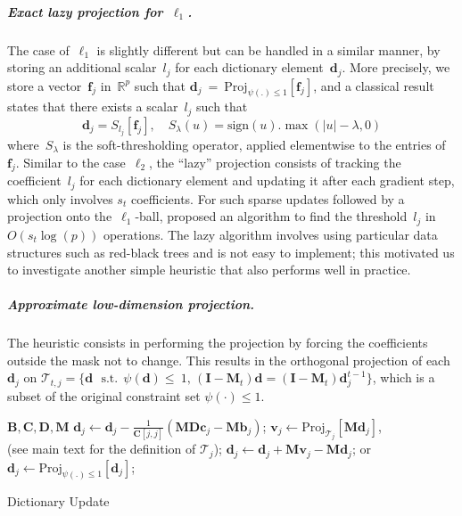 \documentclass{article}
\def\Real{{\mathbb{R}}}
\def\f{{\mathbf f}}
\def\c{{\mathbf c}}
\def\v{{\mathbf v}}
\def\I{{\mathbf I}}
\def\B{{\mathbf B}}
\def\b{{\mathbf b}}
\def\C{{\mathbf C}}
\def\D{{\mathbf D}}
\def\d{{\mathbf d}}
\def\b{{\mathbf b}}
\def\Real{{\mathbb R}}
\def\M{{\mathbf M}}
\begin{document}
\subparagraph{Exact lazy projection for~$\ell_1$.}
The case of~$\ell_1$ is slightly different but can be handled in a similar
manner, by storing an additional scalar~$l_j$ for each dictionary element~$\d_j$.
More precisely, we store a vector~$\f_j$ in~$\Real^p$ such that $\d_j~=~\text{Proj}_{\psi(.) \leq 1}[ \f_j]$,
and a classical result~\citep[see][]{duchi_efficient_2008} states that there
exists a scalar~$l_j$ such that
\begin{equation}
   \d_j = S_{l_j}[\f_j], \quad S_\lambda(u) = \text{sign}(u).
\max(|u|-\lambda,0)
\label{eq:softthreshold}
\end{equation}
where~$S_\lambda$ is the soft-thresholding operator, applied elementwise to the entries of~$\f_j$.
Similar to the case~$\ell_2$, the ``lazy'' projection consists of tracking the
coefficient~$l_j$ for each dictionary element and updating it after each
gradient step, which only involves $s_t$ coefficients.
For such sparse updates followed by a projection onto the~$\ell_1$-ball,
\citet{duchi_efficient_2008} proposed an algorithm to find the
threshold~$l_j$ in $O(s_t \log(p))$ operations.
The lazy algorithm involves using particular data structures such as red-black trees
and is not easy to implement; this motivated us to investigate another
simple heuristic that also performs well in practice.





\subparagraph{Approximate low-dimension projection.}
The heuristic consists in performing the projection by forcing the coefficients outside the mask not to change. This results in the orthogonal projection of each $\d_j$ on
${\mathcal T}_{t,j} = \{\d\ ~~\text{s.t.}~~\psi(\d)\leq~1,\,(\I - \M_t)\d = (\I - \M_t)\d_j^{t-1}\}$, which is a subset of the original constraint set $\psi(\cdot) \leq 1$.


\begin{algorithm}[t]
\begin{algorithmic}
    \REQUIRE $\B, \C, \D, \M$
    	\STATE $\d_j \gets \d_j  - \frac{1}{\C[j, j]}(\M\D\c_j - \M\b_j)$;
                \STATE $\v_j \gets \text{Proj}_{{\mathcal T}_j} \left[\M\d_j \right]$,\\
                (see main text for the definition of ${\mathcal T}_j$);
                \STATE $\d_j \gets \d_j + \M\v_j - \M\d_j$;
                \STATE or $\d_j \gets \text{Proj}_{\psi(.) \leq 1} \left[\d_j \right]$;
		\ENDIF
    \ENDFOR
\end{algorithmic}
\caption{Dictionary Update}
\label{alg:dict_partial}
\end{algorithm}
\end{document}
